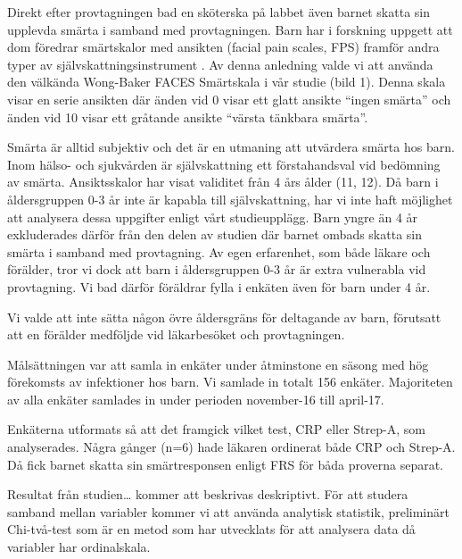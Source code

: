 \documentclass[12pt,twocolumn]{article}
\begin{document}
Direkt efter provtagningen bad en sk\"oterska p\r{a} labbet \"aven barnet skatta
sin upplevda sm\"arta i samband med provtagningen. Barn har i forskning uppgett
att dom f\"oredrar sm\"artskalor med ansikten (facial pain scales, FPS)
framf\"or andra typer av sj\"alvskattningsinstrument \cite{vBayer2006}. Av denna
anledning valde vi att anv\"anda den v\"alk\"anda Wong-Baker FACES Sm\"artskala
i v\r{a}r studie (bild 1). Denna skala visar en serie ansikten d\"ar \"anden vid
0 visar ett glatt ansikte “ingen sm\"arta” och \"anden vid 10 visar ett
gr\r{a}tande ansikte “v\"arsta t\"ankbara sm\"arta”.


Sm\"arta \"ar alltid subjektiv och det \"ar en utmaning att utv\"ardera sm\"arta
hos barn.
Inom h\"also- och sjukv\r{a}rden \"ar sj\"alvskattning ett f\"orstahandsval vid
bed\"omning av sm\"arta. Ansiktsskalor har visat validitet fr\r{a}n 4 \r{a}rs
\r{a}lder (11, 12). D\r{a} barn i \r{a}ldersgruppen 0-3 \r{a}r inte \"ar kapabla
till sj\"alvskattning, har vi inte haft m\"ojlighet att analysera dessa
uppgifter enligt v\r{a}rt studieuppl\"agg. Barn yngre \"an 4 \r{a}r exkluderades
d\"arf\"or fr\r{a}n den delen av studien d\"ar barnet ombads skatta sin sm\"arta
i samband med provtagning. Av egen erfarenhet, som b\r{a}de l\"akare och
f\"or\"alder, tror vi dock att barn i \r{a}ldersgruppen 0-3 \r{a}r \"ar extra
vulnerabla vid provtagning. Vi bad d\"arf\"or f\"or\"aldrar fylla i enk\"aten
\"aven f\"or barn under 4 \r{a}r.

Vi valde att inte s\"atta n\r{a}gon \"ovre \r{a}ldersgr\"ans f\"or deltagande av
barn, f\"orutsatt att en f\"or\"alder medf\"oljde vid l\"akarbes\"oket och
provtagningen.

M\r{a}ls\"attningen var att samla in enk\"ater under \r{a}tminstone en s\"asong
med h\"og f\"orekomsts av infektioner hos barn. Vi samlade in totalt 156
enk\"ater.
Majoriteten av alla enk\"ater samlades in under perioden november-16 till
april-17.

Enk\"aterna utformats s\r{a} att det framgick vilket test, CRP eller Strep-A,
som analyserades. N\r{a}gra g\r{a}nger (n=6) hade l\"akaren ordinerat b\r{a}de
CRP och Strep-A. D\r{a} fick barnet skatta sin sm\"artresponsen enligt FRS f\"or
b\r{a}da proverna separat.

Resultat fr\r{a}n studien… kommer att beskrivas deskriptivt. F\"or att studera
samband mellan variabler kommer vi att anv\"anda analytisk statistik,
prelimin\"art Chi-tv\r{a}-test som \"ar en metod som har utvecklats f\"or att
analysera data d\r{a} variabler har ordinalskala.
\end{document}
